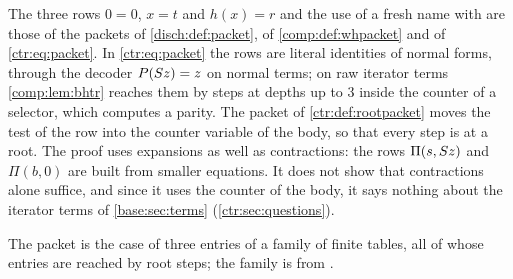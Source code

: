 \begin{remark}\label{ctr:rem:rootpacket}
The three rows $0=0$, $x=t$ and $h(x)=r$ and the use of a fresh name with  are
those of the packets of \cref{disch:def:packet}, of \cref{comp:def:whpacket} and of
\eqref{ctr:eq:packet}. In \eqref{ctr:eq:packet} the rows are literal identities of normal
forms, through the decoder $P(S z)=z$ on normal terms; on raw iterator terms
\cref{comp:lem:bhtr} reaches them by steps at depths up to $3$ inside the counter of a
selector, which computes a parity. The packet of \cref{ctr:def:rootpacket} moves the test of
the row into the counter variable of the body, so that every step is at a root. The proof uses
expansions as well as contractions: the rows $\Pi(s,S z)$ and $\Pi(b,0)$ are built from
smaller equations. It does not show that contractions alone suffice, and since it uses the
counter of the body, it says nothing about the iterator terms of \cref{base:sec:terms}
(\cref{ctr:sec:questions}).
\end{remark}

The packet is the case of three entries of a family of finite tables, all of whose entries
are reached by root steps; the family is from .

